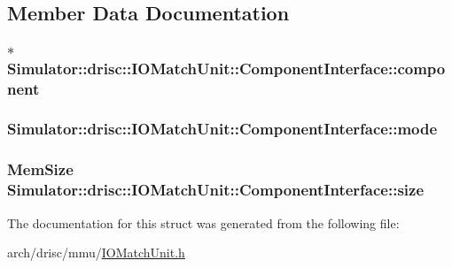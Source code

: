 \subsection{Member Data Documentation}
\hypertarget{struct_simulator_1_1drisc_1_1_i_o_match_unit_1_1_component_interface_af41d61acc8fdc92cbf765b847c3e1458}{
\subsubsection[{component}]{$\ast$ Simulator\+::drisc\+::\+I\+O\+Match\+Unit\+::\+Component\+Interface\+::component}}\label{struct_simulator_1_1drisc_1_1_i_o_match_unit_1_1_component_interface_af41d61acc8fdc92cbf765b847c3e1458}
\hypertarget{struct_simulator_1_1drisc_1_1_i_o_match_unit_1_1_component_interface_a60640fecb6402239f88a4a4a22a0b104}{
\subsubsection[{mode}]{ Simulator\+::drisc\+::\+I\+O\+Match\+Unit\+::\+Component\+Interface\+::mode}}\label{struct_simulator_1_1drisc_1_1_i_o_match_unit_1_1_component_interface_a60640fecb6402239f88a4a4a22a0b104}
\hypertarget{struct_simulator_1_1drisc_1_1_i_o_match_unit_1_1_component_interface_ad26de986f473ef94e97f1af27c04040e}{
\subsubsection[{size}]{\setlength{\rightskip}{0pt plus 5cm}Mem\+Size Simulator\+::drisc\+::\+I\+O\+Match\+Unit\+::\+Component\+Interface\+::size}}\label{struct_simulator_1_1drisc_1_1_i_o_match_unit_1_1_component_interface_ad26de986f473ef94e97f1af27c04040e}


The documentation for this struct was generated from the following file\+:\begin{DoxyCompactItemize}
\item 
arch/drisc/mmu/\hyperlink{_i_o_match_unit_8h}{I\+O\+Match\+Unit.\+h}\end{DoxyCompactItemize}
